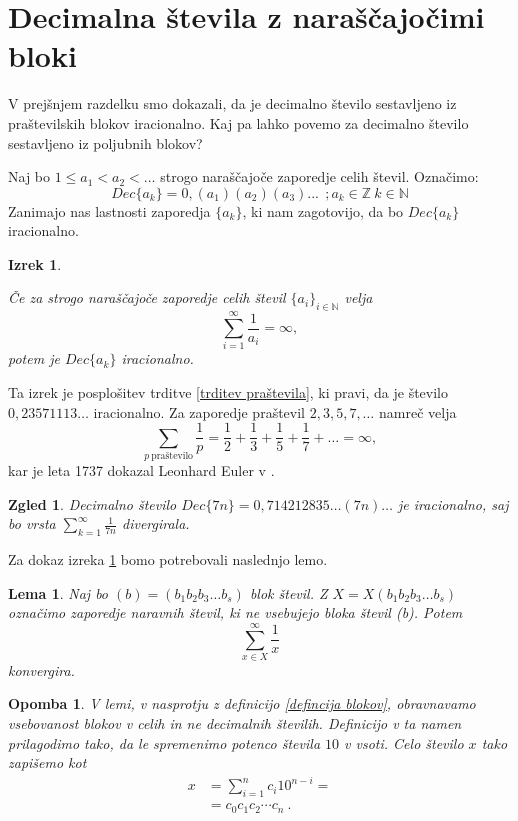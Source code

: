 \documentclass[a4paper,12pt]{article}
\def\N{\mathbb{N}} %
\def\Z{\mathbb{Z}} %
\newtheorem{izrek}{Izrek}
\newtheorem{lema}{Lema}
\newtheorem{opomba}{Opomba}
\newtheorem{zgled}{Zgled}
\begin{document}
\section{Decimalna števila z naraščajočimi bloki}

V prejšnjem razdelku smo dokazali, da je decimalno število sestavljeno iz praštevilskih
blokov iracionalno. Kaj pa lahko povemo za decimalno število sestavljeno iz poljubnih blokov?

Naj bo $1 \leq a_1 < a_2 < \dots $ strogo naraščajoče zaporedje celih števil. 
Označimo: \[Dec\{a_k\} = 0,(a_1)(a_2)(a_3)... \  \ ;  a_k \in \Z \ k \in \N \]
Zanimajo nas lastnosti zaporedja $\{a_k\}$, ki nam zagotovijo, da bo $Dec\{a_k\}$ iracionalno.


\begin{izrek}\label{irac1}
    
    Če za strogo naraščajoče zaporedje celih števil $\{a_i\}_{i \in \N}$ velja 
    \[ \sum_{i=1}^{\infty} \frac{1}{a_i} = \infty ,\]
    potem je $Dec\{a_k\}$ iracionalno.
\end{izrek}

Ta izrek je posplošitev trditve \ref{trditev praštevila}, ki pravi, da je število $0,23571113 \dots$
iracionalno. Za zaporedje praštevil $2, 3, 5, 7, \dots$ namreč velja
\[
    \sum_{p \ \text{praštevilo}}\frac{1}{p} = \frac{1}{2} + \frac{1}{3} + \frac{1}{5} + \frac{1}{7} + \dots = \infty ,\]
kar je leta 1737 dokazal Leonhard Euler v \cite{Eul}.

\begin{zgled}
    Decimalno število $Dec\{7n\} = 0,714212835\dots (7n) \dots$ je iracionalno, saj
    bo vrsta $\sum_{k=1}^{\infty}\frac{1}{7n} $ divergirala.
\end{zgled}

Za dokaz izreka \ref{irac1} bomo potrebovali naslednjo lemo.

\begin{lema}
    Naj bo $(b) = (b_1b_2b_3 \dots b_s)$ blok števil. Z $X = X(b_1b_2b_3 \dots b_s)$ označimo
    zaporedje naravnih števil, ki ne vsebujejo bloka števil (b). Potem 
    \[ \sum_{x \in X}^{\infty} \frac{1}{x}\] konvergira.
\end{lema}

\begin{opomba}
    \label{lema bloki}
    V lemi, v nasprotju z definicijo \ref{defincija blokov}, obravnavamo vsebovanost blokov v celih
    in ne decimalnih številih. Definicijo v ta namen prilagodimo tako, da le spremenimo potenco števila
    $10$ v vsoti. Celo število $x$ tako zapišemo kot 
    \[ 
        \begin{split}
            x & = \sum^n_{i=1} c_i 10^{n-i} = \\
            & = c_0c_1c_2 \cdots c_n \ .
        \end{split} \]
\end{opomba}
\end{document}
